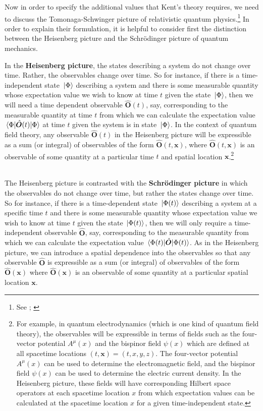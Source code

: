 Now in order to specify the additional values that Kent's theory requires, we need to discuss the Tomonaga-Schwinger picture of relativistic quantum physics.\footnote{See \cite{SchwingerJulianI}; \cite{TomonagaI}} In order to explain their formulation, it is helpful to consider first the distinction between the Heisenberg picture and the Schr\"{o}dinger picture of quantum mechanics. 

In the \textbf{Heisenberg picture}, the states describing a system do not change over time. Rather, the observables change over time. So for instance, if there is a time-independent state $\ket*{\Phi}$ describing a system and there is some measurable quantity whose expectation value we wish to know at time $t$ given the state $\ket*{\Phi}$, then we will need a time dependent observable $\hat{\bm{O}}(t)$, say, corresponding to the measurable quantity at time $t$ from which we can calculate the expectation value $\ev*{\hat{\bm{O}}(t)}{\Phi}$ at time $t$  given the system is in state $\ket*{\Phi}$. In the context of quantum field theory, any observable $\hat{\bm{O}}(t)$ in the Heisenberg picture will be expressible as a sum (or integral) of observables of the form $\hat{\bm{O}}(t, \bm{x})$, where $\hat{\bm{O}}(t, \bm{x})$ is an observable of some quantity at a particular time $t$ and spatial location $\bm{x}$.\footnote{For example, in quantum electrodynamics (which is one kind of quantum field theory), the observables will be expressible in terms of fields such as the four-vector potential $A^\mu(x)$ and the bispinor field $\psi(x)$ which are defined at all spacetime locations $(t, \bm{x})=(t, x, y, z)$. The four-vector potential $A^\mu(x)$ can be used to determine the electromagnetic field, and the bispinor field $\psi(x)$ can be used to determine the electric current density. In the Heisenberg picture, these fields will have corresponding Hilbert space operators at each spacetime location $x$ from which expectation values can be calculated at the spacetime location $x$ for a given time-independent state.}
\strut \\[\baselineskip]
The Heisenberg picture is contrasted with the \textbf{Schr\"{o}dinger picture} in which the observables do not change over time, but rather the states change over time. So for instance, if there is a time-dependent state $\ket*{\Phi(t)}$ describing a system at a specific time $t$ and there is some measurable quantity whose expectation value we wish to know at time $t$ given the state $\ket*{\Phi(t)}$, then we will only require a time-independent observable $\hat{\bm{O}}$, say, corresponding to the measurable quantity from which we can calculate the expectation value $\ev*{\hat{\bm{O}}}{\Phi(t)}$. As in the Heisenberg picture, we can introduce a spatial dependence into the observables so that any observable  $\hat{\bm{O}}$ is expressible as a sum (or integral) of observables of the form $\hat{\bm{O}}(\bm{x})$ where $\hat{\bm{O}}(\bm{x})$ is an observable of some quantity at a particular spatial location $\bm{x}$.

